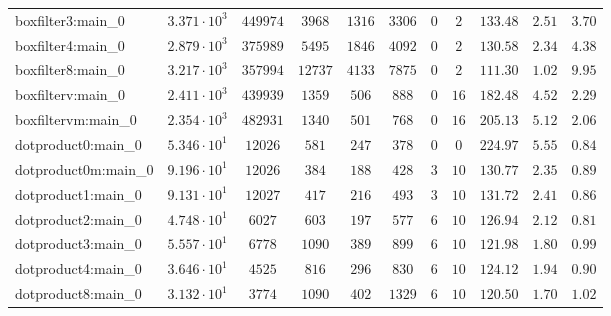 \begin{tabular}{|l|c|c|c|c|c|c|c|c|c|c|}
boxfilter3:main\_0             & $ 3.371 \cdot 10^{3} $ & $ 449974   $ & $ 3968   $ & $ 1316   $ & $ 3306   $ & $ 0    $ & $ 2    $ & $ 133.48      $ & $ 2.51    $ & $ 3.70    $ \\
boxfilter4:main\_0             & $ 2.879 \cdot 10^{3} $ & $ 375989   $ & $ 5495   $ & $ 1846   $ & $ 4092   $ & $ 0    $ & $ 2    $ & $ 130.58      $ & $ 2.34    $ & $ 4.38    $ \\
boxfilter8:main\_0             & $ 3.217 \cdot 10^{3} $ & $ 357994   $ & $ 12737  $ & $ 4133   $ & $ 7875   $ & $ 0    $ & $ 2    $ & $ 111.30      $ & $ 1.02    $ & $ 9.95    $ \\
boxfilterv:main\_0             & $ 2.411 \cdot 10^{3} $ & $ 439939   $ & $ 1359   $ & $ 506    $ & $ 888    $ & $ 0    $ & $ 16   $ & $ 182.48      $ & $ 4.52    $ & $ 2.29    $ \\
boxfiltervm:main\_0            & $ 2.354 \cdot 10^{3} $ & $ 482931   $ & $ 1340   $ & $ 501    $ & $ 768    $ & $ 0    $ & $ 16   $ & $ 205.13      $ & $ 5.12    $ & $ 2.06    $ \\
dotproduct0:main\_0            & $ 5.346 \cdot 10^{1} $ & $ 12026    $ & $ 581    $ & $ 247    $ & $ 378    $ & $ 0    $ & $ 0    $ & $ 224.97      $ & $ 5.55    $ & $ 0.84    $ \\
dotproduct0m:main\_0           & $ 9.196 \cdot 10^{1} $ & $ 12026    $ & $ 384    $ & $ 188    $ & $ 428    $ & $ 3    $ & $ 10   $ & $ 130.77      $ & $ 2.35    $ & $ 0.89    $ \\
dotproduct1:main\_0            & $ 9.131 \cdot 10^{1} $ & $ 12027    $ & $ 417    $ & $ 216    $ & $ 493    $ & $ 3    $ & $ 10   $ & $ 131.72      $ & $ 2.41    $ & $ 0.86    $ \\
dotproduct2:main\_0            & $ 4.748 \cdot 10^{1} $ & $ 6027     $ & $ 603    $ & $ 197    $ & $ 577    $ & $ 6    $ & $ 10   $ & $ 126.94      $ & $ 2.12    $ & $ 0.81    $ \\
dotproduct3:main\_0            & $ 5.557 \cdot 10^{1} $ & $ 6778     $ & $ 1090   $ & $ 389    $ & $ 899    $ & $ 6    $ & $ 10   $ & $ 121.98      $ & $ 1.80    $ & $ 0.99    $ \\
dotproduct4:main\_0            & $ 3.646 \cdot 10^{1} $ & $ 4525     $ & $ 816    $ & $ 296    $ & $ 830    $ & $ 6    $ & $ 10   $ & $ 124.12      $ & $ 1.94    $ & $ 0.90    $ \\
dotproduct8:main\_0            & $ 3.132 \cdot 10^{1} $ & $ 3774     $ & $ 1090   $ & $ 402    $ & $ 1329   $ & $ 6    $ & $ 10   $ & $ 120.50      $ & $ 1.70    $ & $ 1.02    $ \\

\end{tabular}
